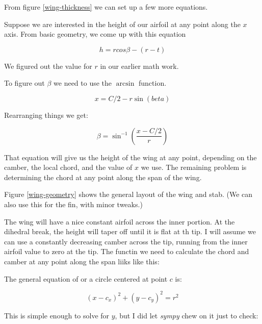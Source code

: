 
From figure \ref{wing-thickness} we can set up a few more equations.


Suppose we are interested in the height of our airfoil at any point along the
{$x$} axis. From basic geometry, we come up with this equation

\begin{equation}
  h = r cos{\beta} - ( r - t )
\end{equation}

We figured out the value for {$r$} in our earlier math work.


To figure out {$\beta$} we need to use the $\arcsin$ function.

\begin{equation}
  x = C / 2 - r \sin(beta)
\end{equation}

Rearranging things we get:

\begin{equation}
  \beta = \sin^{-1} ( \frac{x - C/2}{r} )
\end{equation}

That equation will give us the height of the wing at any point, depending on
the camber, the local chord, and the value of {$x$} we use. The remaining
problem is determining the chord at any point along the span of the wing.

Figure \ref{wing-geometry} shows the general layout of the wing and stab. (We
can also use this for the fin, with minor tweaks.)


The wing will have a nice constant airfoil across the inner portion. At the dihedral break, the height will taper off until it is flat at th tip. I will assume we can use a constantly decreasing camber across the tip, running from the inner airfoil value to zero at the tip. The functin we need to calculate the chord and camber at any point along the span liiks like this:

The general equation of or a circle centered at point {$c$} is:

\begin{equation}
  {(x - c_x)}^2 + {(y - c_y)}^2 = r^2
\end{equation}

This is simple enough to solve for {$y$}, but I did let {\it sympy} chew on it just to check:

